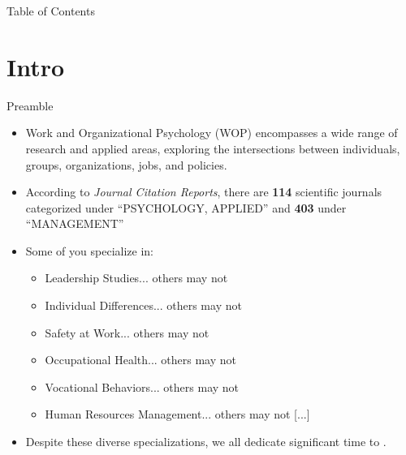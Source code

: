 \documentclass{beamer}
\begin{document}

\begin{frame}{Table of Contents}
    \tableofcontents
\end{frame}



\section{Intro}


\begin{frame}{Preamble}
    \begin{itemize}
        \item<1> Work and Organizational Psychology (WOP) encompasses a wide range of research and applied areas, exploring the intersections between individuals, groups, organizations, jobs, and policies.
        \item<2> According to \textit{Journal Citation Reports}, there are \textbf{114} scientific journals categorized under ``PSYCHOLOGY, APPLIED'' and \textbf{403} under ``MANAGEMENT''
        \item<3> Some of you specialize in:
            \begin{itemize}
                \item Leadership Studies... others may not
                \item Individual Differences... others may not
                \item Safety at Work... others may not
                \item Occupational Health... others may not
                \item Vocational Behaviors... others may not
                \item Human Resources Management... others may not [...]
            \end{itemize}
        \item<4> Despite these diverse specializations, we all dedicate significant time to .
    \end{itemize}
\end{frame}
\end{document}
